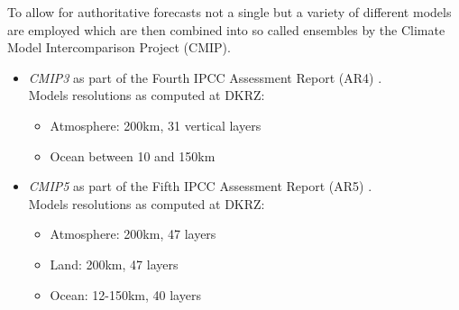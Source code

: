 To allow for authoritative forecasts not a single but a variety of different models are employed which are then combined into so called ensembles by the Climate Model Intercomparison Project (CMIP). 

\begin{itemize}
	\item \emph{CMIP3} as part of the Fourth IPCC Assessment Report (AR4) \cite{ipcc_ipcc_2010}. \\
	Models resolutions as computed at DKRZ:

	\begin{itemize}
		\item Atmosphere: 200km, 31 vertical layers
		\item Ocean between 10 and 150km
	\end{itemize}

	\item \emph{CMIP5} as part of the Fifth IPCC Assessment Report (AR5) \cite{ipcc_ipcc_2013}. \\
		Models resolutions as computed at DKRZ:

	\begin{itemize}
		\item Atmosphere: 200km, 47 layers
		\item Land: 200km, 47 layers
		\item Ocean: 12-150km, 40 layers
	\end{itemize}


\end{itemize}






%
%
%
%

